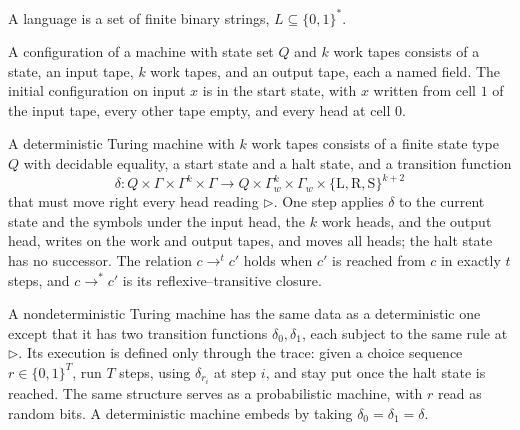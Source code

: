 \begin{definition}[Language]
  \label{def:language}
  \leanok
  A language is a set of finite binary strings, $L \subseteq \{0,1\}^*$.
\end{definition}

\begin{definition}[Configuration]
  \label{def:models-cfg}
  \leanok
  A configuration of a machine with state set $Q$ and $k$ work tapes consists of
  a state, an input tape, $k$ work tapes, and an output tape, each a named
  field. The initial configuration on input $x$ is in the start state, with $x$
  written from cell $1$ of the input tape, every other tape empty, and every
  head at cell $0$.
\end{definition}

\begin{definition}
  \label{def:tm}
  \leanok
  A deterministic Turing machine with $k$ work tapes consists of a finite state
  type $Q$ with decidable equality, a start state and a halt state, and a
  transition function
  \[
    \delta : Q \times \Gamma \times \Gamma^k \times \Gamma \to
      Q \times \Gamma_w^k \times \Gamma_w \times \{\mathrm{L}, \mathrm{R}, \mathrm{S}\}^{k+2}
  \]
  that must move right every head reading $\triangleright$. One step applies
  $\delta$ to the current state and the symbols under the input head, the $k$
  work heads, and the output head, writes on the work and output tapes, and
  moves all heads; the halt state has no successor. The relation
  $c \to^t c'$ holds when $c'$ is reached from $c$ in exactly $t$ steps, and
  $c \to^* c'$ is its reflexive--transitive closure.
\end{definition}

\begin{definition}
  \label{def:ntm}
  \leanok
  A nondeterministic Turing machine has the same data as a deterministic one
  except that it has two transition functions $\delta_0, \delta_1$, each
  subject to the same rule at $\triangleright$. Its
  execution is defined only through the trace: given a choice sequence
  $r \in \{0,1\}^T$, run $T$ steps, using $\delta_{r_i}$ at step $i$, and stay
  put once the halt state is reached. The same structure serves as a
  probabilistic machine, with $r$ read as random bits. A deterministic machine
  embeds by taking $\delta_0 = \delta_1 = \delta$.
\end{definition}

